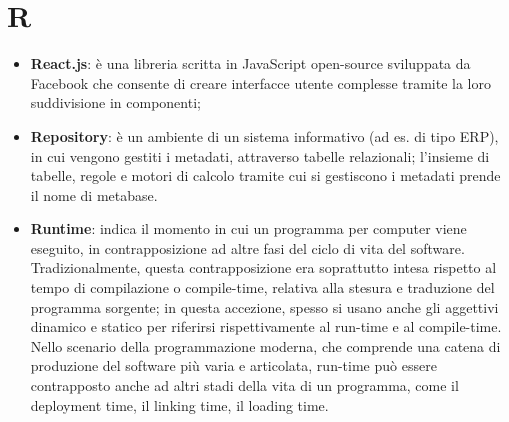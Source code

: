 \section{R}
\begin{itemize}
\item
\textbf{React.js}: è una libreria scritta in JavaScript open-source sviluppata da Facebook che consente di creare interfacce utente complesse tramite la loro suddivisione in componenti;
\item
\textbf{Repository}: è un ambiente di un sistema informativo (ad es. di tipo ERP), in cui vengono gestiti i metadati, attraverso tabelle relazionali; l'insieme di tabelle, regole e motori di calcolo tramite cui si gestiscono i metadati prende il nome di metabase. 
\item
\textbf{Runtime}: indica il momento in cui un programma per computer viene eseguito, in contrapposizione ad altre fasi del ciclo di vita del software.
Tradizionalmente, questa contrapposizione era soprattutto intesa rispetto al tempo di compilazione o compile-time, relativa alla stesura e traduzione del programma sorgente; in questa accezione, spesso si usano anche gli aggettivi dinamico e statico per riferirsi rispettivamente al run-time e al compile-time. Nello scenario della programmazione moderna, che comprende una catena di produzione del software più varia e articolata, run-time può essere contrapposto anche ad altri stadi della vita di un programma, come il deployment time, il linking time, il loading time.
\end{itemize}
